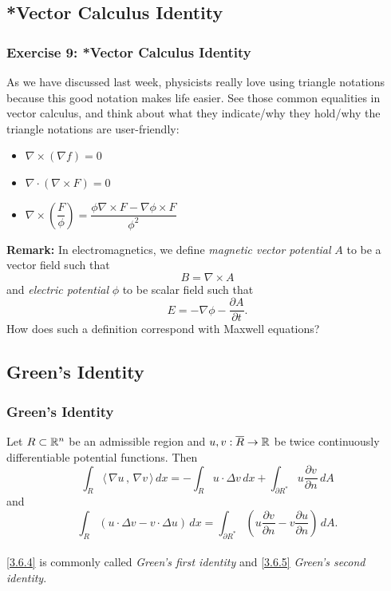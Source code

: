\documentclass[11pt, t]{beamer}
\renewcommand{\emph}[1]{{\color{Turquoise3}\textsl{#1}}}
\newcommand{\Remark}{\textbf{Remark: }}
\newcommand{\scp}[2]{\langle\,#1\,,\,#2\,\rangle} \newcommand{\scpp}{\langle\,\cdot\,,\,\cdot\,\rangle}
\begin{document}
\subsection{*Vector Calculus Identity}
\begin{frame}
    \frametitle{Exercise 9: *Vector Calculus Identity}
    As we have discussed last week, physicists really love using triangle notations because this good notation makes life easier. See those common equalities in vector calculus, and think about what they indicate/why they hold/why the triangle notations are user-friendly:
    \begin{itemize}
        \item $\nabla\times(\nabla f)=0$
        \item $\nabla\cdot(\nabla\times F)=0$
        \item $\nabla \times\left(\dfrac{F}{\phi}\right)=\dfrac{\phi \nabla \times F-\nabla \phi \times F}{\phi^{2}}$
    \end{itemize}
    \vspace{10pt}
    \Remark In electromagnetics, we define \emph{magnetic vector potential} $A$ to be a vector field such that 
    $$B=\nabla\times A$$ and \emph{electric potential} $\phi$ to be scalar field such that $$E=-\nabla \phi -\dfrac{\partial A}{\partial t}.$$
    How does such a definition correspond with Maxwell equations?
\end{frame}

\subsection{Green's Identity}
\begin{frame}
    \frametitle{Green's Identity}
    Let $R\subset\mathbb{R}^n$ be an admissible region and $u,v:\overline{R}\to\mathbb{R}$ be twice continuously dif{}ferentiable potential functions. Then
    \begin{equation}\label{3.6.4}
        \int_R\scp{\nabla u}{\nabla v}\,dx=-\int_R u\cdot\Delta v\,dx+\int_{\partial R^*}u\frac{\partial v}{\partial n}\,dA
    \end{equation}
    and
    \begin{equation}\label{3.6.5}
        \int_R(u\cdot\Delta v-v\cdot\Delta u)\,dx=\int_{\partial R^*}\left(u\frac{\partial v}{\partial n}-v\frac{\partial u}{\partial n}\right)\,dA.
    \end{equation}
    \\[16pt]
    \eqref{3.6.4} is commonly called \emph{Green's first identity} and \eqref{3.6.5} \emph{Green's second identity}.\\[9pt]
\end{frame}
\end{document}
